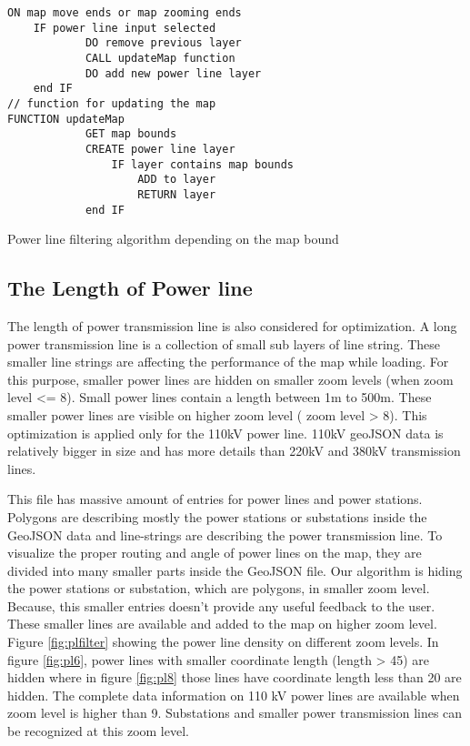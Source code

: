 \begin{Listing}
\begin{lstlisting}
ON map move ends or map zooming ends
	IF power line input selected
			DO remove previous layer
			CALL updateMap function
			DO add new power line layer
	end IF
// function for updating the map
FUNCTION updateMap
			GET map bounds
			CREATE power line layer
				IF layer contains map bounds
					ADD to layer
					RETURN layer
			end IF
\end{lstlisting}
\caption{Power line filtering algorithm depending on the map bound}
\label{lst:plBound}
\end{Listing}

\subsection{The Length of Power line}

The length of power transmission line is also considered for optimization. A long power transmission line is a collection of small sub layers of line string. These smaller line strings are affecting the performance of the map while loading.  For this purpose, smaller power lines are hidden on smaller zoom levels (when zoom level <= 8).  Small power lines contain a length between 1m to 500m. These smaller power lines are visible on higher zoom level ( zoom level > 8). This optimization is applied only for the 110kV power line. 110kV geoJSON data is relatively bigger in size and has more details than 220kV and 380kV transmission lines. 

This file has massive amount of entries for power lines and power stations. Polygons are describing mostly the power stations or substations inside the GeoJSON data and line-strings are describing the power transmission line. To visualize the proper routing and angle of power lines on the map, they are divided into many smaller parts inside the GeoJSON file. Our algorithm is hiding the power stations or substation, which are polygons, in smaller zoom level. Because, this smaller entries doesn't provide any useful feedback to the user. These smaller lines are available and added to the map on higher zoom level. Figure \ref{fig:plfilter} showing the power line density on different zoom levels. In figure \ref{fig:pl6}, power lines with smaller coordinate length (length > 45) are hidden where in figure \ref{fig:pl8} those lines have coordinate length less than 20 are hidden. The complete data information on 110 kV power lines are available when zoom level is higher than 9. Substations and smaller power transmission lines can be recognized at this zoom level. 

